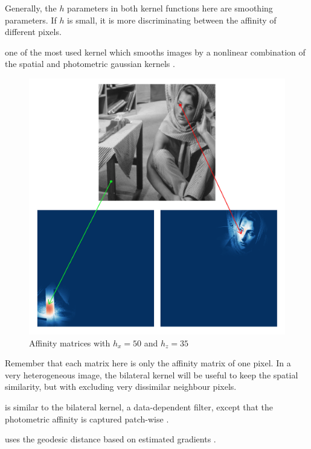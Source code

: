 \begin{description}[align=left]
  Generally, the \(h\) parameters in both kernel functions here are smoothing parameters.
  If \(h\) is small, it is more discriminating between the affinity of different pixels.

 \item [Bilateral Kernel] one of the most used kernel which smooths images by a nonlinear combination of the spatial and photometric gaussian kernels \cite{siam_slides_2016} \cite{glide_2014}.

  \begin{figure}[H]
      \centering
      \includegraphics[width=\textwidth]{img/bilateralAffinityPhoto35Spatial50.png}
      \caption{Affinity matrices with \(h_x = 50\) and \(h_z = 35\)}
  \end{figure}

  Remember that each matrix here is only the affinity matrix of one pixel.
  In a very heterogeneous image, the bilateral kernel will be useful to keep the spatial similarity, but with excluding very dissimilar neighbour pixels.

 \item [Non-Local Means (NLM)] is similar to the bilateral kernel, a data-dependent filter, except that the photometric affinity is captured patch-wise \cite{glide_2014}.
 \item [Locally Adaptive Regression Kernel (LARK)] uses the geodesic distance based on estimated gradients \cite{milanfar_symmetrizing_2013} \cite{takeda_kernel_2007}.
\end{description}

